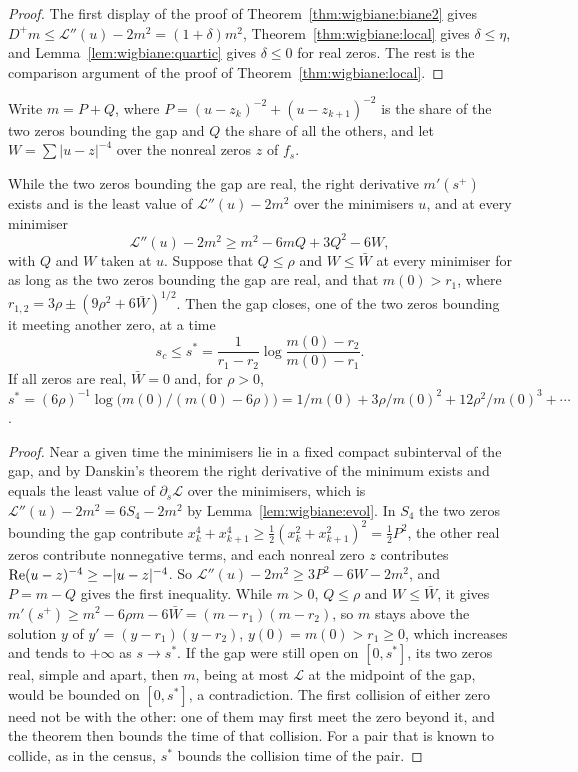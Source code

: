 \begin{proof}
The first display of the proof of Theorem~\ref{thm:wigbiane:biane2} gives $D^+m\le\mathcal L''(u)-2m^2=(1+\delta)m^2$, Theorem~\ref{thm:wigbiane:local} gives $\delta\le\eta$, and Lemma~\ref{lem:wigbiane:quartic} gives $\delta\le0$ for real zeros. The rest is the comparison argument of the proof of Theorem~\ref{thm:wigbiane:local}.
\end{proof}

Write $m=P+Q$, where $P=(u-z_k)^{-2}+(u-z_{k+1})^{-2}$ is the share of the two zeros bounding the gap and $Q$ the share of all the others, and let $W=\sum|u-z|^{-4}$ over the nonreal zeros $z$ of $f_s$.

\begin{theorem}[a deadline]\label{thm:wigbiane:upper}
While the two zeros bounding the gap are real, the right derivative $m'(s^+)$ exists and is the least value of $\mathcal L''(u)-2m^2$ over the minimisers $u$, and at every minimiser
\[
\mathcal L''(u)-2m^2\ge m^2-6mQ+3Q^2-6W,
\]
with $Q$ and $W$ taken at $u$. Suppose that $Q\le\rho$ and $W\le\bar W$ at every minimiser for as long as the two zeros bounding the gap are real, and that $m(0)>r_1$, where $r_{1,2}=3\rho\pm(9\rho^2+6\bar W)^{1/2}$. Then the gap closes, one of the two zeros bounding it meeting another zero, at a time
\[
s_c\le s^*=\frac1{r_1-r_2}\log\frac{m(0)-r_2}{m(0)-r_1}.
\]
If all zeros are real, $\bar W=0$ and, for $\rho>0$, $s^*=(6\rho)^{-1}\log\big(m(0)/(m(0)-6\rho)\big)=1/m(0)+3\rho/m(0)^2+12\rho^2/m(0)^3+\cdots$.
\end{theorem}

\begin{proof}
Near a given time the minimisers lie in a fixed compact subinterval of the gap, and by Danskin's theorem the right derivative of the minimum exists and equals the least value of $\partial_s\mathcal L$ over the minimisers, which is $\mathcal L''(u)-2m^2=6S_4-2m^2$ by Lemma~\ref{lem:wigbiane:evol}. In $S_4$ the two zeros bounding the gap contribute $x_k^4+x_{k+1}^4\ge\frac12(x_k^2+x_{k+1}^2)^2=\frac12P^2$, the other real zeros contribute nonnegative terms, and each nonreal zero $z$ contributes $\operatorname{Re}(u-z)^{-4}\ge-|u-z|^{-4}$. So $\mathcal L''(u)-2m^2\ge3P^2-6W-2m^2$, and $P=m-Q$ gives the first inequality. While $m>0$, $Q\le\rho$ and $W\le\bar W$, it gives $m'(s^+)\ge m^2-6\rho m-6\bar W=(m-r_1)(m-r_2)$, so $m$ stays above the solution $y$ of $y'=(y-r_1)(y-r_2)$, $y(0)=m(0)>r_1\ge0$, which increases and tends to $+\infty$ as $s\to s^*$. If the gap were still open on $[0,s^*]$, its two zeros real, simple and apart, then $m$, being at most $\mathcal L$ at the midpoint of the gap, would be bounded on $[0,s^*]$, a contradiction. The first collision of either zero need not be with the other: one of them may first meet the zero beyond it, and the theorem then bounds the time of that collision. For a pair that is known to collide, as in the census, $s^*$ bounds the collision time of the pair.
\end{proof}

